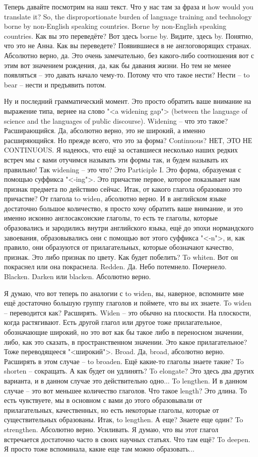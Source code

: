 \documentclass[main.tex]{subfiles}
\begin{document}
Теперь давайте посмотрим на наш текст.
Что у нас там за фраза и how would you translate it?
So, the disproportionate burden of language training and technology borne by non-English speaking countries.
Borne by non-English speaking countries.
Как вы это переведёте?
Вот здесь borne by.
Видите, здесь by.
Понятно, что это не Анна.
Как вы переведете?
Появившиеся в не англоговорящих странах.
Абсолютно верно, да.
Это очень замечательно, без какого-либо соотношения вот с этим вот значением рождения, да, как бы давания жизни.
Но тем не менее появляться -- это давать начало чему-то.
Потому что что такое нести?
Нести -- to bear -- нести и предъявить потом.

Ну и последний грамматический момент.
Это просто обратить ваше внимание на выражение типа, вернее на слово "<a widening gap"> (between the language of science and the languages of public discourse).
Widening -- что это такое?
Расширающийся.
Да, абсолютно верно, это не широкий, а именно расширяющийся.
Но прежде всего, что это за форма?
Continuous?
НЕТ, ЭТО НЕ CONTINUOUS.
Я надеюсь, что ещё за оставшиеся несколько наших редких встреч мы с вами отучимся называть эти формы так, и будем называть их правильно!
Так widening -- это что?
Это Participle I.
Это форма, образуемая с помощью суффикса "<-ing">.
Это причастие первое, которое показывает нам признак предмета по действию сейчас.
Итак, от какого глагола образовано это причастие?
От глагола to widen, абсолютно верно.
И в английском языке достаточно большое количество, я просто хочу обратить ваше внимание, и это именно исконно англосаксонские глаголы, то есть те глаголы, которые образовались и зародились внутри английского языка, ещё до эпохи нормандского завоевания, образовывались они с помощью вот этого суффикса "<-n">, и, как правило, они образуются от прилагательных, которые обозначают качество, признак.
Это либо признак по цвету.
Как будет побелить?
To whiten.
Вот он покраснел или она покраснела.
Redden.
Да.
Небо потемнело.
Почернело.
Blacken.
Darken или blacken.
Абсолютно верно.

Я думаю, что вот теперь по аналогии с to widen, вы, наверное, вспомните мне ещё достаточно большую группу глаголов и поймете, что вы их знаете.
To widen -- переводится как?
Расширять.
Widen -- это обычно на плоскости.
На плоскости, когда растягивают.
Есть другой глагол или другое тоже прилагательное, обозначающие широкий, но это вот как бы такое либо в переносном значении, либо, как это сказать, в пространственном значении.
Это какое прилагательное?
Тоже переводящееся "<широкий">.
Broad.
Да, broad, абсолютно верно.
Расширять в этом случае -- to broaden.
Ещё какие-то глаголы знаете такие?
To shorten -- сокращать.
А как будет он удлинять?
To elongate?
Это здесь два других варианта, и в данном случае это действительно одно...
To lengthen.
И в данном случае -- это вот меньшее количество глаголов.
Что такое length?
Это длина.
То есть чувствуете, мы в основном с вами до этого образовывали от прилагательных, качественных, но есть некоторые глаголы, которые от существительных образованы.
Итак, to lengthen.
А еще?
Знаете еще один?
To strengthen.
Абсолютно верно.
Усиливать.
Я думаю, что вы этот глагол встречается достаточно часто в своих научных статьях.
Что там ещё?
To deepen.
Я просто тоже вспоминала, какие еще там можно образовать...
\end{document}
